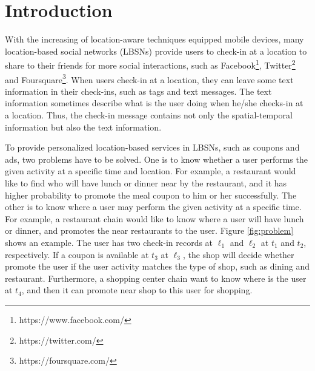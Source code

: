 \chapter{Introduction}
\label{sec:1}


With the increasing of location-aware techniques equipped mobile devices, many location-based social networks (LBSNs) provide users to check-in at a location to share to their friends for more social interactions, such as Facebook\footnote{https://www.facebook.com/}, Twitter\footnote{https://twitter.com/} and Foursquare\footnote{https://foursquare.com/}. When users check-in at a location, they can leave some text information in their check-ins, such as tags and text messages.  The text information sometimes describe what is the user doing when he/she checks-in at a location. Thus, the check-in message contains not only the spatial-temporal information but also the text information.



To provide personalized location-based services in LBSNs, such as coupons and ads, two problems have to be solved. One is to know whether a user performs the given activity at a specific time and location. For example, a restaurant would like to find who will have lunch or dinner near by the restaurant, and it has higher probability to promote the meal coupon to him or her successfully. The other is to know where a user may perform the given activity at a specific time. For example, a restaurant chain would like to know where a user will have lunch or dinner, and promotes the near restaurants to the user. Figure \ref{fig:problem} shows an example. The user has two check-in records at $\ell_1$ and $\ell_2$ at $t_1$ and $t_2$, respectively. If a coupon is available at $t_3$ at $\ell_3$, the shop will decide whether promote the user if the user activity matches the type of shop, such as dining and restaurant. Furthermore, a shopping center chain want to know where is the user at $t_4$, and then it can promote near shop to this user for shopping.


